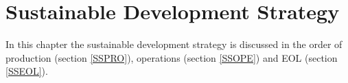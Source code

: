 \chapter{Sustainable Development Strategy}
\label{SS}

In this chapter the sustainable development strategy is discussed in the order of production (section \ref{SSPRO}), operations (section \ref{SSOPE}) and \ac{EOL} (section \ref{SSEOL}).